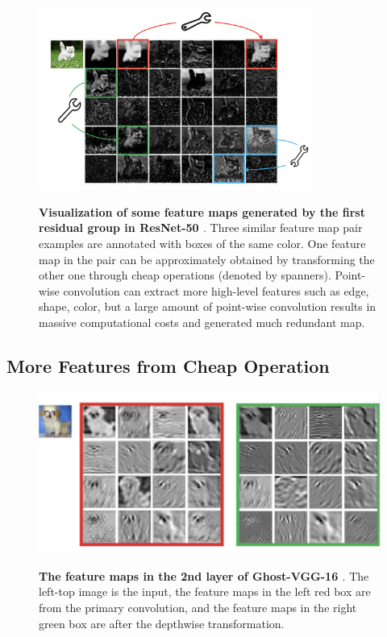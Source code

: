 \begin{figure}[t]
\begin{center}
\centering
\includegraphics[width=0.8\textwidth]{thesis-template-master/images/ghostpointwise.png}
\label{fig:cellnet}
\end{center}
\caption{\textbf{Visualization of some feature maps generated by the first residual group in ResNet-50 \cite{19}}.  Three similar feature map pair examples are annotated with boxes of the same color. One feature map in the pair can be approximately obtained by transforming the other one through cheap operations (denoted by spanners). Point-wise convolution can extract more high-level features such as edge, shape, color, but a large amount of point-wise convolution results in massive computational costs  and generated much redundant map.}
\label{fig:2.7}
\end{figure}


\subsection{ More Features from Cheap Operation}


\begin{figure}[t]
\begin{center}
\centering
\includegraphics[width=\textwidth]{thesis-template-master/images/ghostgener.png}
\label{fig:cellnet}
\end{center}
\caption{\textbf{The feature maps in the 2nd layer of Ghost-VGG-16  \cite{19}}.  The left-top image is the input, the feature maps in the left red box are from the primary convolution, and the feature maps in the right green box are after the depthwise transformation.}
\label{fig:2.8}
\end{figure}

